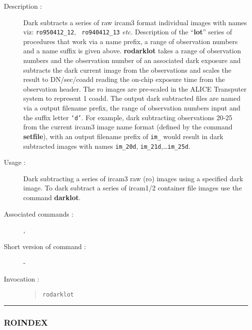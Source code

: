 \begin{description}

\item[Description :] Dark subtracts a series of raw {\sc ircam3} format
individual images with names viz:  {\tt ro950412\_12}, {\tt
ro940412\_13} \emph{etc.} Description of the ``{\bf lot}'' series of
procedures that work via a name prefix, a range of observation numbers
and a name suffix is given above.  {\bf rodarklot} takes a range of
observation numbers and the observation number of an associated dark
exposure and subtracts the dark current image from the observations and
scales the result to DN/sec/coadd reading the on-chip exposure time
from the observation header.  The {\sc ro} images are pre-scaled in the
ALICE Transputer system to represent 1 coadd.  The output dark
subtracted files are named via a output filename prefix, the range of
observation numbers input and the suffix letter {\tt `d'}.  For
example, dark subtracting observations 20-25 from the current {\sc
ircam3} image name format (defined by the command {\bf setfile}), with
an output filename prefix of {\tt im\_} would result in dark subtracted
images with names {\tt im\_20d}, {\tt im\_21d},\ldots {\tt im\_25d}.

\item[Usage :] Dark subtracting a series of {\sc ircam3} raw ({\sc ro})
images using a specified dark image.  To dark subtract a series of {\sc
ircam1/2} container file images use the command {\bf darklot}.

\item[Associated commands :] {\tt {}},
{\tt {}}
\item[Short version of command :] -
\item[Invocation :]

\begin{quote}{\tt  rodarklot }\end{quote}

\end{description}

\hrule
\subsubsection*{\label{ROINDEX}ROINDEX}

